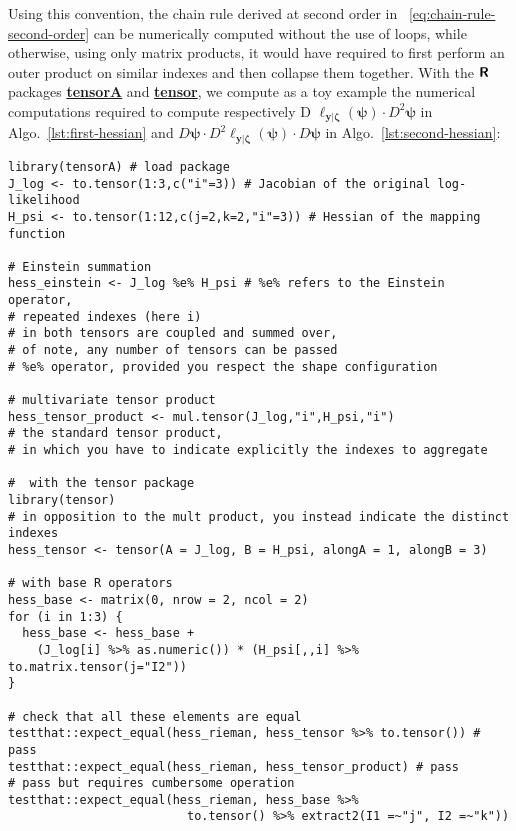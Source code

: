\documentclass[long, final]{jobim}
\newcommand{\CRANpkg}[1]{\href{https://CRAN.R-project.org/package=#1}{\textbf{#1}}}
\begin{document}
Using this convention, the chain rule derived at second order in \equationname~\ref{eq:chain-rule-second-order} can be numerically computed without the use of loops, while otherwise, using only matrix products, it would have required to first perform an outer product on similar indexes and then collapse them together. With the $\textbf{\textsf{R}}$ packages \CRANpkg{tensorA} and \CRANpkg{tensor}, we compute as a toy example the numerical computations required to compute respectively D $\ell_{\boldsymbol{y}|\boldsymbol{\zeta}} (\boldsymbol{\psi}) \cdot D^2 \boldsymbol{\psi}$ in Algo.~\ref{lst:first-hessian} and $D \boldsymbol{\psi} \cdot  D^2 \ell_{\boldsymbol{y}|\boldsymbol{\zeta}} (\boldsymbol{\psi})  \cdot D\boldsymbol{\psi}$ in Algo.~\ref{lst:second-hessian}:

\clearpage

\begin{lstlisting}[caption={Computation of the First part of the Hessian},label={lst:first-hessian}]
library(tensorA) # load package
J_log <- to.tensor(1:3,c("i"=3)) # Jacobian of the original log-likelihood
H_psi <- to.tensor(1:12,c(j=2,k=2,"i"=3)) # Hessian of the mapping function

# Einstein summation
hess_einstein <- J_log %e% H_psi # %e% refers to the Einstein operator,
# repeated indexes (here i)
# in both tensors are coupled and summed over,
# of note, any number of tensors can be passed
# %e% operator, provided you respect the shape configuration

# multivariate tensor product
hess_tensor_product <- mul.tensor(J_log,"i",H_psi,"i")
# the standard tensor product,
# in which you have to indicate explicitly the indexes to aggregate

#  with the tensor package
library(tensor)
# in opposition to the mult product, you instead indicate the distinct indexes
hess_tensor <- tensor(A = J_log, B = H_psi, alongA = 1, alongB = 3)

# with base R operators
hess_base <- matrix(0, nrow = 2, ncol = 2)
for (i in 1:3) {
  hess_base <- hess_base +
    (J_log[i] %>% as.numeric()) * (H_psi[,,i] %>% to.matrix.tensor(j="I2"))
}

# check that all these elements are equal
testthat::expect_equal(hess_rieman, hess_tensor %>% to.tensor()) # pass
testthat::expect_equal(hess_rieman, hess_tensor_product) # pass
# pass but requires cumbersome operation
testthat::expect_equal(hess_rieman, hess_base %>%
                         to.tensor() %>% extract2(I1 =~"j", I2 =~"k"))
\end{lstlisting}
\end{document}
